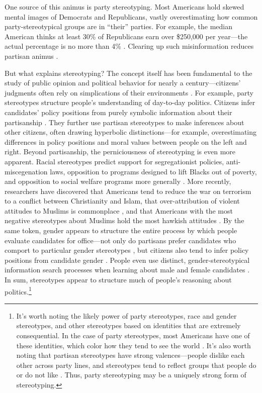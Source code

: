 \documentclass[12pt, letterpaper]{article}
\begin{document}
One source of this animus is party stereotyping. Most Americans hold skewed mental images of Democrats and Republicans, vastly overestimating how common party-stereotypical groups are in ``their'' parties. For example, the median American thinks at least 30\% of Republicans earn over \$250,000 per year---the actual percentage is no more than 4\% \citep{ahler2018parties}. Clearing up such misinformation reduces partisan animus \citep{ahler2018parties}.

But what explains stereotyping? The concept itself has been fundamental to the study of public opinion and political behavior for nearly a century---citizens' judgments often rely on simplications of their environments \citep[e.g.,][]{Lippmann1922, edwards1940four}. For example, party stereotypes structure people's understanding of day-to-day politics. Citizens infer candidates' policy positions from purely symbolic information about their partisanship \citep{goggin2017disputed, lodge1986partisan, Rahn1993}. They further use partisan stereotypes to make inferences about other citizens, often drawing hyperbolic distinctions---for example, overestimating differences in policy positions \citep{LevenduskyMalhotra2013} and moral values \citep{GrahamNosekHaidt2012} between people on the left and right. Beyond partisanship, the perniciousness of stereotyping is even more apparent. Racial stereotypes predict support for segregationist policies, anti-miscegenation laws, opposition to programs designed to lift Blacks out of poverty, and opposition to social welfare programs more generally \citep{carmines2011on, ditonto2013AMPing, gilens1995racial, gilens1996poq, gilens1996race, peffley1997racial, sniderman1993scar}. More recently, researchers have discovered that Americans tend to reduce the war on terrorism to a conflict between Christianity and Islam, that over-attribution of violent attitudes to Muslims is commonplace \citep{tessler2003arab}, and that Americans with the most negative stereotypes about Muslims hold the most hawkish attitudes \citep{sides2013stereotypes}. By the same token, gender appears to structure the entire process by which people evaluate candidates for office---not only do partisans prefer candidates who comport to particular gender stereotypes \citep{bernhard2019wearing}, but citizens also tend to infer policy positions from candidate gender \citep{ditonto2014gender}. People even use distinct, gender-stereotypical information search processes when learning about male and female candidates \citep{huddy1993gender}. In sum, stereotypes appear to structure much of people's reasoning about politics.\footnote{It's worth noting the likely power of party stereotypes, race and gender stereotypes, and other stereotypes based on identities that are extremely consequential. In the case of party stereotypes, most Americans have one of these identities, which color how they tend to see the world \citep[e.g.][]{bartels2000}. It's also worth noting that partisan stereotypes have strong valences---people dislike each other across party lines, and stereotypes tend to reflect groups that people do or do not like \citep{kane2021who}. Thus, party stereotyping may be a uniquely strong form of stereotyping.}
\end{document}
